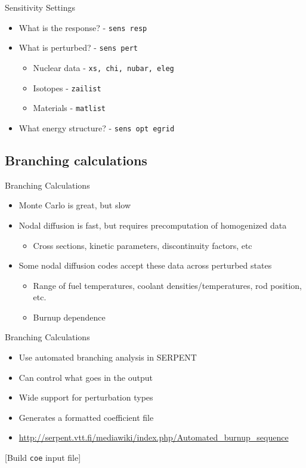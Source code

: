 \documentclass{beamer}
\newcommand{\examplefile}[1]{\centerline{[Build \texttt{#1} input file]}}
\begin{document}
\begin{frame}{Sensitivity Settings}
    \begin{itemize}
        \item{What is the response? - \texttt{sens resp}}
        \item{What is perturbed? - \texttt{sens pert}}
        \begin{itemize}
            \item{Nuclear data - \texttt{xs, chi, nubar, eleg}}
            \item{Isotopes - \texttt{zailist}}
            \item{Materials - \texttt{matlist}}
        \end{itemize}
        \item{What energy structure? - \texttt{sens opt egrid}}
    \end{itemize}
\end{frame}

\subsection{Branching calculations}

\begin{frame}{Branching Calculations}
    \begin{itemize}
        \item{Monte Carlo is great, but slow}
        \item{Nodal diffusion is fast, but requires precomputation of homogenized data}
        \begin{itemize}
            \item{Cross sections, kinetic parameters, discontinuity factors, etc}
        \end{itemize}
        \item{Some nodal diffusion codes accept these data across perturbed states}
        \begin{itemize}
            \item{Range of fuel temperatures, coolant densities/temperatures, rod position, etc.}
            \item{Burnup dependence}
        \end{itemize}
    \end{itemize}
\end{frame}

\begin{frame}{Branching Calculations}
    \begin{itemize}
        \item{Use automated branching analysis in SERPENT}
        \item{Can control what goes in the output}
        \item{Wide support for perturbation types}
        \item{Generates a formatted coefficient file}
        \item{\url{http://serpent.vtt.fi/mediawiki/index.php/Automated\_burnup\_sequence}}
    \end{itemize}
    \examplefile{coe}
\end{frame}
\end{document}
